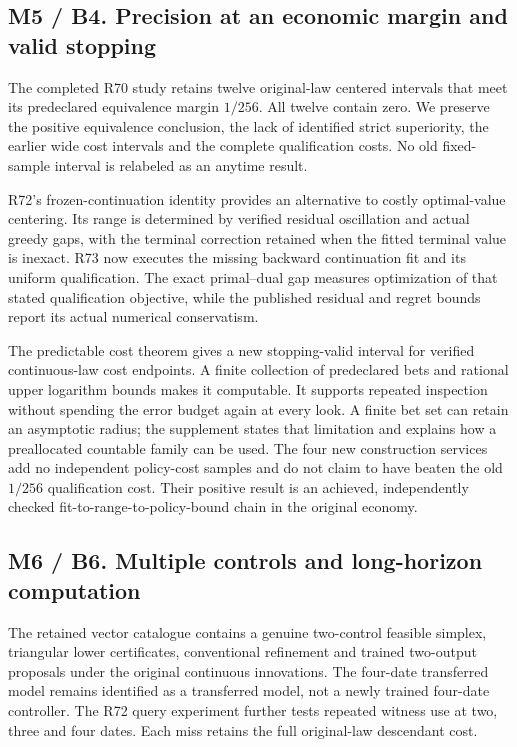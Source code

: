 \documentclass[ecta,nameyear,draft]{econsocart}
\begin{document}
\hypertarget{m5-b4.-precision-at-an-economic-margin-and-valid-stopping}{%
\subsection{M5 / B4. Precision at an economic margin and valid
stopping}\label{m5-b4.-precision-at-an-economic-margin-and-valid-stopping}}

The completed R70 study retains twelve original-law centered intervals
that meet its predeclared equivalence margin \(1/256\). All twelve
contain zero. We preserve the positive equivalence conclusion, the lack
of identified strict superiority, the earlier wide cost intervals and
the complete qualification costs. No old fixed-sample interval is
relabeled as an anytime result.

R72's frozen-continuation identity provides an alternative to costly
optimal-value centering. Its range is determined by verified residual
oscillation and actual greedy gaps, with the terminal correction
retained when the fitted terminal value is inexact. R73 now executes the
missing backward continuation fit and its uniform qualification. The
exact primal--dual gap measures optimization of that stated
qualification objective, while the published residual and regret bounds
report its actual numerical conservatism.

The predictable cost theorem gives a new stopping-valid interval for
verified continuous-law cost endpoints. A finite collection of
predeclared bets and rational upper logarithm bounds makes it
computable. It supports repeated inspection without spending the error
budget again at every look. A finite bet set can retain an asymptotic
radius; the supplement states that limitation and explains how a
preallocated countable family can be used. The four new construction
services add no independent policy-cost samples and do not claim to have
beaten the old \(1/256\) qualification cost. Their positive result is an
achieved, independently checked fit-to-range-to-policy-bound chain in
the original economy.

\hypertarget{m6-b6.-multiple-controls-and-long-horizon-computation}{%
\subsection{M6 / B6. Multiple controls and long-horizon
computation}\label{m6-b6.-multiple-controls-and-long-horizon-computation}}

The retained vector catalogue contains a genuine two-control feasible
simplex, triangular lower certificates, conventional refinement and
trained two-output proposals under the original continuous innovations.
The four-date transferred model remains identified as a transferred
model, not a newly trained four-date controller. The R72 query
experiment further tests repeated witness use at two, three and four
dates. Each miss retains the full original-law descendant cost.
\end{document}
